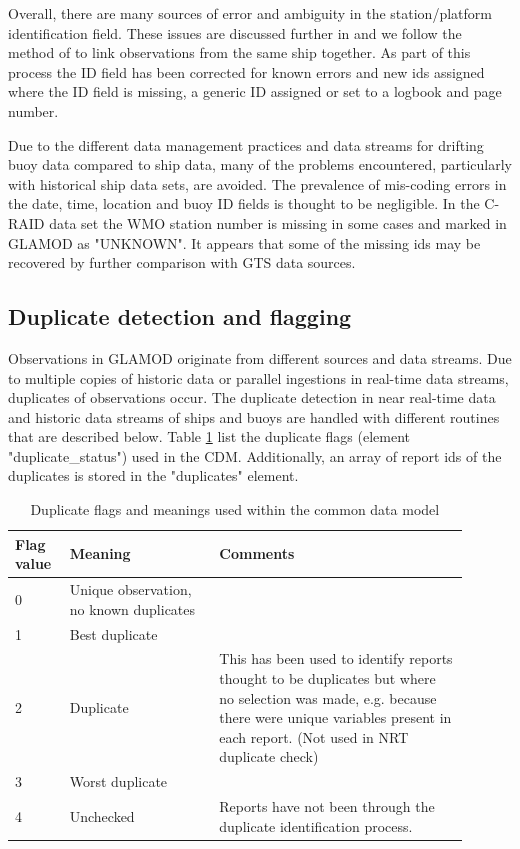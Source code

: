{Overall, there are many sources of error and ambiguity in the station/platform identification field.
These issues are discussed further in \cite{Carella2017_tracking} and we follow the method of \cite{Carella2017_tracking} to link observations from the same ship together.
As part of this process the ID field has been corrected for known errors and new ids assigned where the ID field is missing, a generic ID assigned or set to a logbook and page number.

Due to the different data management practices and data streams for drifting buoy data compared to ship data, many of the problems encountered, particularly with historical ship data sets, are avoided. 
The prevalence of mis-coding errors in the date, time, location and buoy ID fields is thought to be negligible.
In the C-RAID data set the WMO station number is missing in some cases and marked in GLAMOD as "UNKNOWN". It appears that some of the missing ids may be recovered by further comparison with GTS data sources.


\FloatBarrier

\subsection{Duplicate detection and flagging} \label{dupelim}

Observations in GLAMOD originate from different sources and data streams. Due to multiple copies of historic data or parallel ingestions in real-time data streams, duplicates of observations occur.
The duplicate detection in near real-time data and historic data streams of ships and buoys are handled with different routines that are described below. Table \ref{tab:dup_flags} list the duplicate flags (element "duplicate\_status") used in the CDM. Additionally, an array of report ids of the duplicates is stored in the "duplicates" element.

\begin{table}[h]
	\centering
	\caption{Duplicate flags and meanings used within the common data model}
	\label{tab:dup_flags}
	\begin{tabular}{|p{0.1\linewidth}|p{0.3\linewidth}|p{0.5\linewidth}|}
		\hline
		\bfseries Flag value & \bfseries Meaning & \bfseries Comments \\
		\hline
		0 & Unique observation, no known duplicates & \\\hline
		1 & Best duplicate & \\\hline
		2 & Duplicate & This has been used to identify reports thought to be duplicates but where no selection was made, e.g. because there were unique variables present in each report. (Not used in NRT duplicate check) \\\hline
		3 & Worst duplicate & \\\hline
		4 & Unchecked & Reports have not been through the duplicate identification process.\\\hline
	\end{tabular}
\end{table}

}
